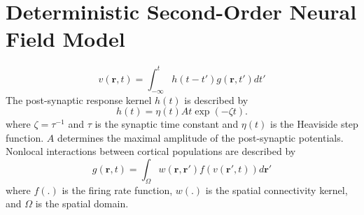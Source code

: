 \documentclass[a4paper,10pt]{article}
\begin{document}
\section{Deterministic Second-Order Neural Field Model}
\begin{equation}\label{SpikesToPotential}
	v\left( {\mathbf{r},t} \right) = \int_{ - \infty }^t {h\left( {t - t'} \right)g\left( {\mathbf{r},t'} \right)dt'}
\end{equation}
The post-synaptic response kernel $h(t)$ is described by
\begin{equation}\label{SynapticRespKernel}
	h(t) = \eta(t)At\exp{\left(-\zeta t\right)}.
\end{equation}
where $\zeta=\tau^{-1}$ and $\tau$ is the synaptic time constant and $\eta(t)$ is the Heaviside step function. $A$ determines the maximal amplitude of the post-synaptic potentials.
Nonlocal interactions between cortical populations are described by	
\begin{equation}\label{RateBasedInteractions}
	g\left( \mathbf{r},t \right) = \int_\Omega  {w\left( \mathbf{r},\mathbf{r}' \right)f\left( v\left( \mathbf{r}',t \right) \right)d\mathbf{r}'} 
\end{equation}
where $f(.)$ is the firing rate function, $w(.)$ is the spatial connectivity kernel, and $\Omega$ is the spatial domain.
\end{document}
